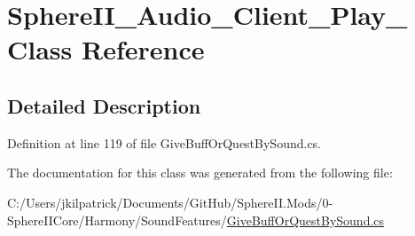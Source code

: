 \hypertarget{class_sphere_i_i___audio___client___play__2}{}\section{Sphere\+I\+I\+\_\+\+Audio\+\_\+\+Client\+\_\+\+Play\+\_ Class Reference}
\label{class_sphere_i_i___audio___client___play__2}


\subsection{Detailed Description}


Definition at line 119 of file Give\+Buff\+Or\+Quest\+By\+Sound.\+cs.



The documentation for this class was generated from the following file\+:\begin{DoxyCompactItemize}
\item 
C\+:/\+Users/jkilpatrick/\+Documents/\+Git\+Hub/\+Sphere\+I\+I.\+Mods/0-\/\+Sphere\+I\+I\+Core/\+Harmony/\+Sound\+Features/\mbox{\hyperlink{_give_buff_or_quest_by_sound_8cs}{Give\+Buff\+Or\+Quest\+By\+Sound.\+cs}}\end{DoxyCompactItemize}
